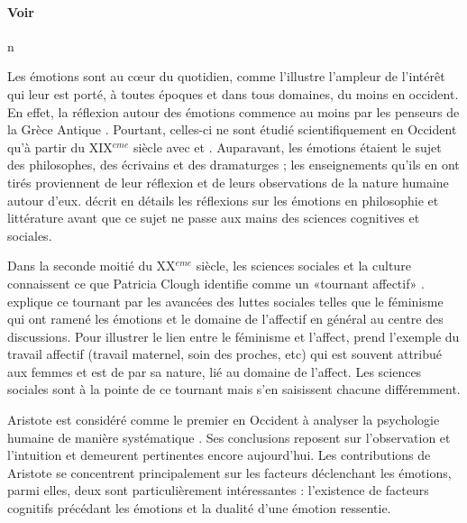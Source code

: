 \documentclass[a4paper,12pt, openany]{book}
\begin{document}
\paragraph{Voir \textcites{hirschman82, holbrook82}} n



Les émotions sont au cœur du quotidien, comme l'illustre l'ampleur de l'intérêt qui leur est porté, à toutes époques et dans tous domaines, du moins en occident. En effet, la réflexion autour des émotions commence au moins par les penseurs de la Grèce Antique \parencite{plamper15}. Pourtant, celles-ci ne sont étudié scientifiquement en Occident qu'à partir du XIX$^{eme}$ siècle avec \textcite{darwin1872} et \textcites{james1884, james1894} \parencite{marcus2000}. Auparavant, les émotions étaient le sujet des philosophes, des écrivains et des dramaturges ; les enseignements qu'ils en ont tirés proviennent de leur réflexion et de leurs observations de la nature humaine autour d'eux.  \textcite{elster98} décrit en détails les réflexions sur les émotions en philosophie et littérature avant que ce sujet ne passe aux mains des sciences cognitives et sociales. \par 

Dans la seconde moitié du XX$^{eme}$ siècle, les sciences sociales et la culture connaissent ce que Patricia Clough identifie comme un «\;tournant affectif\;» \parencite{clough07}. \textcite{hardt07} explique ce tournant par les avancées des luttes sociales telles que le féminisme qui ont ramené les émotions et le domaine de l'affectif en général au centre des discussions. Pour illustrer le lien entre le féminisme et l'affect, \textcite{hardt07} prend l'exemple du travail affectif (travail maternel, soin des proches, etc) qui est souvent attribué aux femmes et est de par sa nature, lié au domaine de l'affect. Les sciences sociales sont à la pointe de ce tournant mais s'en saisissent chacune différemment. \par 

Aristote est considéré comme le premier en Occident à analyser la psychologie humaine de manière systématique \parencite{kennedy91}. Ses conclusions reposent sur l'observation et l'intuition et demeurent pertinentes encore aujourd'hui. Les contributions de Aristote se concentrent principalement sur les facteurs déclenchant les émotions, parmi elles, deux sont particulièrement intéressantes : l'existence de facteurs cognitifs précédant les émotions et la dualité d'une émotion ressentie. \par 
\end{document}
